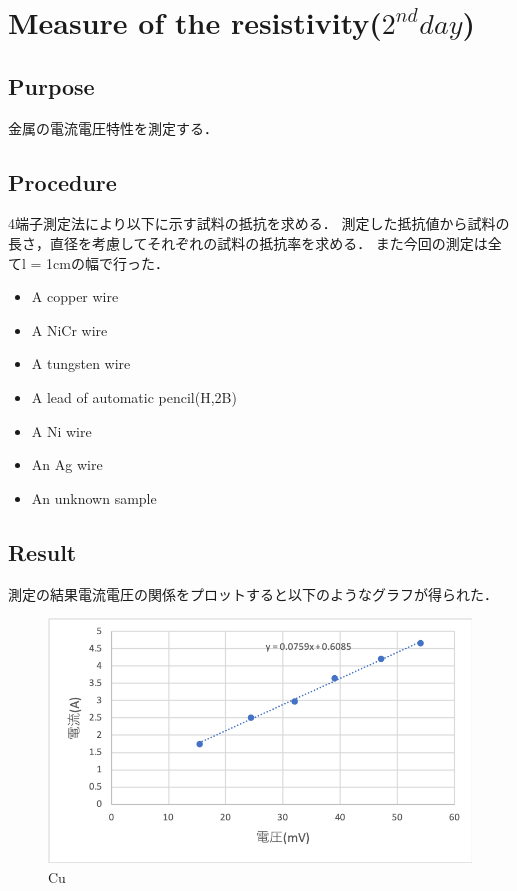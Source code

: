 \documentclass[11pt, a4paper,twocolumn]{jarticle}
\begin{document}
\section{Measure of the resistivity($2^{nd} day$)}

\subsection{Purpose}
金属の電流電圧特性を測定する．
\subsection{Procedure}
4端子測定法により以下に示す試料の抵抗を求める．
測定した抵抗値から試料の長さ，直径を考慮してそれぞれの試料の抵抗率を求める．
また今回の測定は全てl = 1cmの幅で行った．
\begin{itemize}
    \item A copper wire
    \item A NiCr wire
    \item A tungsten wire
    \item A lead of automatic pencil(H,2B)
    \item A Ni wire
    \item An Ag wire
    \item An unknown sample
\end{itemize}
\subsection{Result}
測定の結果電流電圧の関係をプロットすると以下のようなグラフが得られた．

\begin{figure}[htbp]
 \begin{center}
  \includegraphics[width=0.8\linewidth]{fig15.png}
 \end{center}
 \caption{Cu}
 \label{fig:15}
\end{figure}
\end{document}
